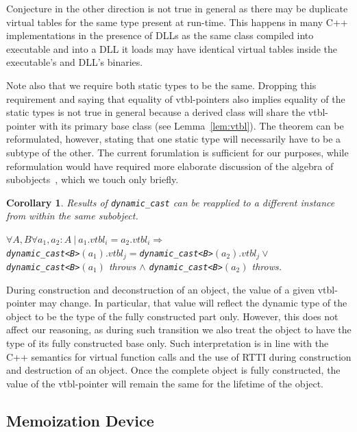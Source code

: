 \documentclass[preprint]{sigplanconf}
\makeatletter
\DeclareRobustCommand{\code}[1]{{\lstinline[breaklines=false,escapechar=@]{#1}}}
\newtheorem{corollary}{Corollary}
\makeatother
\begin{document}
\noindent
Conjecture in the other direction is not true in general as there may be 
duplicate virtual tables for the same type present at run-time. This happens in 
many C++ implementations in the presence of DLLs as the same class compiled into 
executable and into a DLL it loads may have identical virtual tables inside the 
executable's and DLL's binaries.

Note also that we require both static types to be the same. Dropping this 
requirement and saying that equality of vtbl-pointers also implies equality of 
the static types is not true in general because a derived class will share the 
vtbl-pointer with its primary base class (see Lemma~\ref{lem:vtbl}). The theorem 
can be reformulated, however, stating that one static type will necessarily have 
to be a subtype of the other. The current forumlation is sufficient for our 
purposes, while reformulation would have required more elaborate discussion of 
the algebra of subobjects~\cite{RDL11}, which we touch only briefly.

\begin{corollary}
Results of \code{dynamic_cast} can be reapplied to a different instance from 
within the same subobject. 

$\forall A,B \forall a_1, a_2 : A\ |\ a_1.vtbl_i = a_2.vtbl_i \Rightarrow$ \\
\code{dynamic_cast<B>}$(a_1).vtbl_j = $\code{dynamic_cast<B>}$(a_2).vtbl_j \vee$ \\
\code{dynamic_cast<B>}$(a_1)$ throws $\wedge$ \code{dynamic_cast<B>}$(a_2)$ throws.
\label{crl:vtbl}
\end{corollary}

\noindent
During construction and deconstruction of 
an object, the value of a given vtbl-pointer may change. In particular, 
that value will reflect the dynamic type of the object to be the type of the 
fully constructed part only. However, this does not affect our reasoning, as during 
such transition we also treat the object to have the type of its fully 
constructed base only. Such interpretation is in line with the C++ semantics for 
virtual function calls and the use of RTTI during construction and destruction of an 
object. Once the complete object is fully constructed, the value of the 
vtbl-pointer will remain the same for the lifetime of the object.

\subsection{Memoization Device}
\label{sec:memdev}
\end{document}
